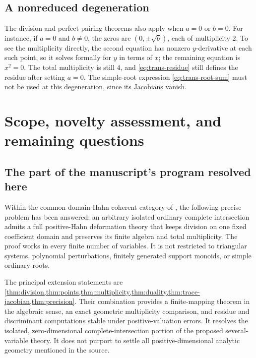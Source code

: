 \documentclass[11pt,letterpaper]{article}
\theoremstyle{definition}
\theoremstyle{remark}
\numberwithin{equation}{section}
\begin{document}
\subsection{A nonreduced degeneration}
The division and perfect-pairing theorems also apply when $a=0$ or $b=0$. For instance, if $a=0$ and $b\ne0$, the zeros are $(0,\pm\sqrt b)$, each of multiplicity $2$. To see the multiplicity directly, the second equation has nonzero $y$-derivative at each such point, so it solves formally for $y$ in terms of $x$; the remaining equation is $x^2=0$. The total multiplicity is still $4$, and \eqref{eq:trans-residue} still defines the residue after setting $a=0$. The simple-root expression \eqref{eq:trans-root-sum} must not be used at this degeneration, since its Jacobians vanish.

\section{Scope, novelty assessment, and remaining questions}\label{sec:status}

\subsection{The part of the manuscript's program resolved here}
Within the common-domain Hahn-coherent category of \cite{Companion}, the following precise problem has been answered: an arbitrary isolated ordinary complete intersection admits a full positive-Hahn deformation theory that keeps division on one fixed coefficient domain and preserves its finite algebra and total multiplicity. The proof works in every finite number of variables. It is not restricted to triangular systems, polynomial perturbations, finitely generated support monoids, or simple ordinary roots.

The principal extension statements are \cref{thm:division,thm:points,thm:multiplicity,thm:duality,thm:trace-jacobian,thm:precision}. Their combination provides a finite-mapping theorem in the algebraic sense, an exact geometric multiplicity comparison, and residue and discriminant computations stable under positive-valuation errors. It resolves the isolated, zero-dimensional complete-intersection portion of the proposed several-variable theory. It does not purport to settle all positive-dimensional analytic geometry mentioned in the source.
\end{document}

